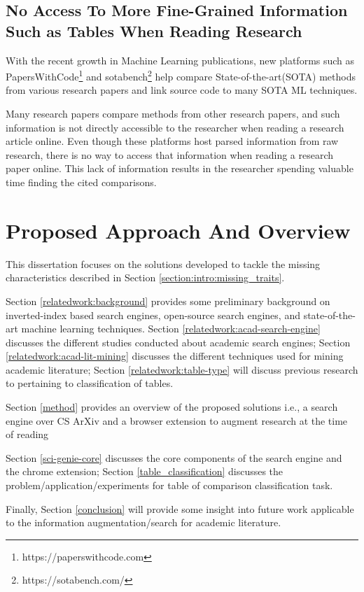\subsection{No Access To More Fine-Grained Information Such as Tables When Reading Research}
With the recent growth in Machine Learning publications, new platforms such as PapersWithCode\footnote{https://paperswithcode.com} and 
sotabench\footnote{https://sotabench.com/} help compare State-of-the-art(SOTA) methods from various research papers and link source code 
to many SOTA ML techniques. 

Many research papers compare methods from other research papers, and such information is not directly accessible to the
researcher when reading a research article online. Even though these platforms 
host parsed information from raw research, there is no way to access that information when reading a research paper online. 
This lack of information results in the researcher spending valuable time finding the cited comparisons.

\section{Proposed Approach And Overview}
This dissertation focuses on the solutions developed to tackle the missing characteristics described in Section \ref{section:intro:missing_traits}. 

Section \ref{relatedwork:background} provides some preliminary background on inverted-index based search engines, open-source search engines, and state-of-the-art machine learning techniques.
Section \ref{relatedwork:acad-search-engine} discusses the different studies conducted about academic search engines; Section \ref{relatedwork:acad-lit-mining} discusses the different techniques used for mining academic literature; Section \ref{relatedwork:table-type} will discuss previous research to pertaining to classification of tables. 

Section \ref{method} provides an overview of the proposed solutions i.e., a search engine over CS ArXiv and a browser extension to augment research at the time of reading 

Section \ref{sci-genie-core} discusses the core components of the search engine and the chrome extension; Section \ref{table_classification}
discusses the problem/application/experiments for table of comparison classification task.

Finally, Section \ref{conclusion} will provide some insight into future work applicable to the information augmentation/search for academic literature.